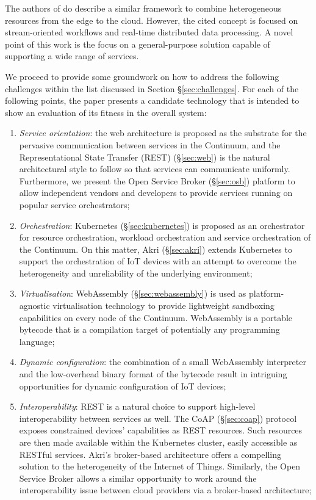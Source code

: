 The authors of \cite{balouek2019towards} do describe a similar framework to combine heterogeneous resources from the edge to the cloud. However, the cited concept is focused on stream-oriented workflows and real-time distributed data processing. A novel point of this work is the focus on a general-purpose solution capable of supporting a wide range of services. 

We proceed to provide some groundwork on how to address the following challenges within the list discussed in Section §\ref{sec:challenges}. For each of the following points, the paper presents a candidate technology that is intended to show an evaluation of its fitness in the overall system:

\begin{enumerate}
    \item \emph{Service orientation}: the web architecture is proposed as the substrate for the pervasive communication between services in the Continuum, and the Representational State Transfer (REST) (§\ref{sec:web}) is the natural architectural style to follow so that services can communicate uniformly. Furthermore, we present the Open Service Broker (§\ref{sec:osb}) platform to allow independent vendors and developers to provide services running on popular service orchestrators;
    \item \emph{Orchestration}: Kubernetes (§\ref{sec:kubernetes}) is proposed as an orchestrator for resource orchestration, workload orchestration and service orchestration of the Continuum. On this matter, Akri (§\ref{sec:akri}) extends Kubernetes to support the orchestration of IoT devices with an attempt to overcome the heterogeneity and unreliability of the underlying environment;
    \item \emph{Virtualisation}: WebAssembly (§\ref{sec:webassembly}) is used as platform-agnostic virtualisation technology to provide lightweight sandboxing capabilities on every node of the Continuum. WebAssembly is a portable bytecode that is a compilation target of potentially any programming language;
    \item \emph{Dynamic configuration}: the combination of a small WebAssembly interpreter and the low-overhead binary format of the bytecode result in intriguing opportunities for dynamic configuration of IoT devices;
    \item \emph{Interoperability}: REST is a natural choice to support high-level interoperability between services as well. The CoAP (§\ref{sec:coap}) protocol exposes constrained devices' capabilities as REST resources. Such resources are then made available within the Kubernetes cluster, easily accessible as RESTful services. Akri's broker-based architecture offers a compelling solution to the heterogeneity of the Internet of Things. Similarly, the Open Service Broker allows a similar opportunity to work around the interoperability issue between cloud providers via a broker-based architecture;

\end{enumerate}
